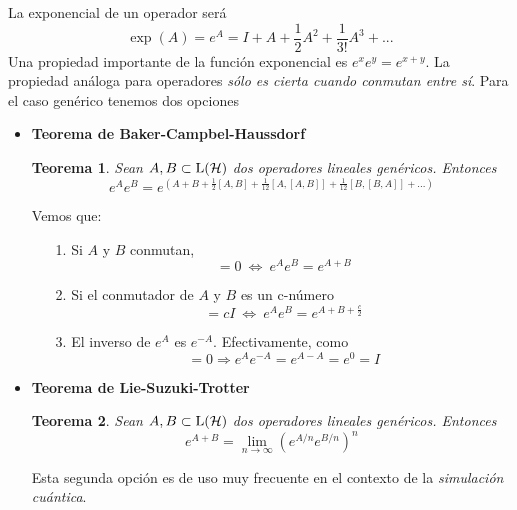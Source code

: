 \documentclass[a4paper,11pt]{book} %
\newtheorem{teorema_contador}{Teorema}
\newcommand{\Teorema}[1]{
		\begin{mybox_gray2}{}
			\begin{teorema_contador}
				 #1 
			\end{teorema_contador} 
		\end{mybox_gray2}
	}
\numberwithin{equation}{chapter}
\begin{document}
La exponencial de un operador será
	\begin{equation}
	\exp(A) = e^A = I + A + \frac{1}{2} A^2 + \frac{1}{3!} A^3 + ...
	\end{equation}
Una propiedad importante de la función exponencial es  $e^xe^y = e^{x+y}$. La propiedad análoga para operadores \textit{sólo es cierta cuando conmutan entre sí}. Para el caso genérico tenemos dos opciones
\begin{itemize}
	\item \textbf{Teorema de Baker-Campbel-Haussdorf}
	\Teorema{
	Sean $A,B\subset{\rm L}(\mathcal{H})$ dos operadores lineales genéricos. Entonces
		\begin{equation}
	e^A e^B = e^{\left({A+B + \frac{1}{2}[A,B] + \frac{1}{12}[A,[A,B]]+ \frac{1}{12}[B,[B,A]] + ...}\right)}
		\end{equation}
	}

	Vemos que:
	\begin{itemize}
		\item[1.] Si $A$ y $B$ conmutan, 
		\begin{equation}
		[A,B]=0 ~\Leftrightarrow ~e^A e^B = e^{A+B}
		\end{equation}
		
		\item[2.] Si el conmutador de $A$ y $B$  es un c-número 
		\begin{equation}
		[A,B]= c I  ~\Leftrightarrow ~  e^A e^B = e^{A+B + \frac{c}{2}}
		\end{equation}
		
		\item[3.] El inverso de $e^A$ es $e^{-A}$. Efectivamente, como 
		\begin{equation}
		[A,A]=0 \Rightarrow e^A e^{-A} = e^{A-A} = e^0 = I
		\end{equation}

	\end{itemize}
	
	\item \textbf{Teorema de Lie-Suzuki-Trotter}
	
	\Teorema{
	Sean $A,B\subset{\rm L}(\mathcal{H})$ dos operadores lineales genéricos. Entonces
		\begin{equation}
		e^{A+B} = \lim_{n\to\infty} \left(e^{{A/n}} e^{B/n}\right)^n
		\end{equation}
	}
	Esta segunda opción es de uso muy frecuente en el contexto de la \textit{simulación cuántica}. 
\end{itemize}
\end{document}
